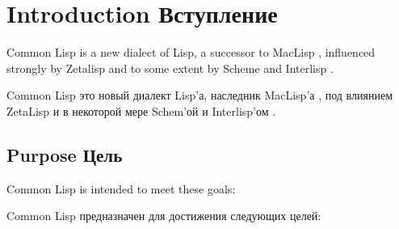 


\clearpage\def\pagestatus{FINAL PROOF}
\chapter{Introduction Вступление}

Common Lisp is a new dialect of Lisp, a
successor to MacLisp \cite{MOONUAL,PITMANUAL}, influenced strongly by
Zetalisp \cite{BLUE-LISPM,GREEN-LISPM} and to some extent by Scheme
\cite{SCHEME-REVISED-REPORT} and Interlisp \cite{INTERLISP}.

Common Lisp это новый диалект Lisp'а, наследник
MacLisp'а \cite{MOONUAL,PITMANUAL}, под влиянием
ZetaLisp \cite{BLUE-LISPM,GREEN-LISPM} и в некоторой мере
Schem'ой \cite{SCHEME-REVISED-REPORT} и Interlisp'ом \cite{INTERLISP}.

\section{Purpose Цель}

Common Lisp is intended to meet these goals:

Common Lisp предназначен для достижения следующих целей:

